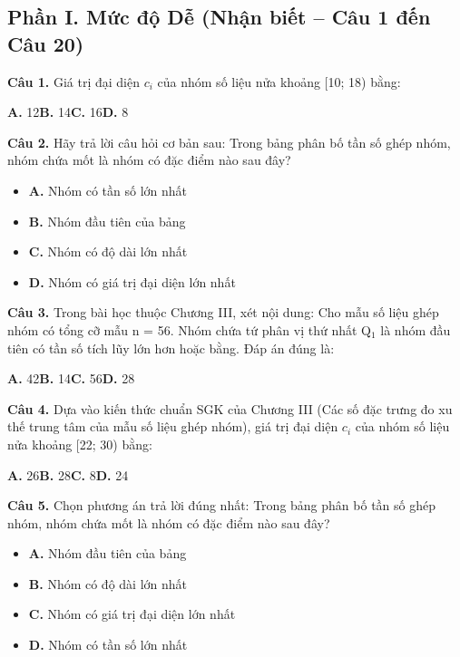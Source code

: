 \documentclass[11pt,a4paper]{article}
\begin{document}
\subsection*{\color{accent} Phần I. Mức độ Dễ (Nhận biết -- Câu 1 đến Câu 20)}
\textbf{\color{primary} Câu 1.} Giá trị đại diện $c_i$ của nhóm số liệu nửa khoảng [10; 18) bằng:\par
\hspace*{1.5em}\textbf{A.} 12\quad\quad \textbf{B.} 14\quad\quad \textbf{C.} 16\quad\quad \textbf{D.} 8\par\vspace{2pt}
\textbf{\color{primary} Câu 2.} Hãy trả lời câu hỏi cơ bản sau: Trong bảng phân bố tần số ghép nhóm, nhóm chứa mốt là nhóm có đặc điểm nào sau đây?\par
\begin{itemize}\setlength{\itemsep}{1pt}\setlength{\parskip}{0pt}
  \item[] \textbf{A.} Nhóm có tần số lớn nhất
  \item[] \textbf{B.} Nhóm đầu tiên của bảng
  \item[] \textbf{C.} Nhóm có độ dài lớn nhất
  \item[] \textbf{D.} Nhóm có giá trị đại diện lớn nhất
\end{itemize}\vspace{2pt}
\textbf{\color{primary} Câu 3.} Trong bài học thuộc Chương III, xét nội dung: Cho mẫu số liệu ghép nhóm có tổng cỡ mẫu n = 56. Nhóm chứa tứ phân vị thứ nhất Q$_1$ là nhóm đầu tiên có tần số tích lũy lớn hơn hoặc bằng. Đáp án đúng là:\par
\hspace*{1.5em}\textbf{A.} 42\quad\quad \textbf{B.} 14\quad\quad \textbf{C.} 56\quad\quad \textbf{D.} 28\par\vspace{2pt}
\textbf{\color{primary} Câu 4.} Dựa vào kiến thức chuẩn SGK của Chương III (Các số đặc trưng đo xu thế trung tâm của mẫu số liệu ghép nhóm), giá trị đại diện $c_i$ của nhóm số liệu nửa khoảng [22; 30) bằng:\par
\hspace*{1.5em}\textbf{A.} 26\quad\quad \textbf{B.} 28\quad\quad \textbf{C.} 8\quad\quad \textbf{D.} 24\par\vspace{2pt}
\textbf{\color{primary} Câu 5.} Chọn phương án trả lời đúng nhất: Trong bảng phân bố tần số ghép nhóm, nhóm chứa mốt là nhóm có đặc điểm nào sau đây?\par
\begin{itemize}\setlength{\itemsep}{1pt}\setlength{\parskip}{0pt}
  \item[] \textbf{A.} Nhóm đầu tiên của bảng
  \item[] \textbf{B.} Nhóm có độ dài lớn nhất
  \item[] \textbf{C.} Nhóm có giá trị đại diện lớn nhất
  \item[] \textbf{D.} Nhóm có tần số lớn nhất
\end{itemize}\vspace{2pt}
\end{document}
